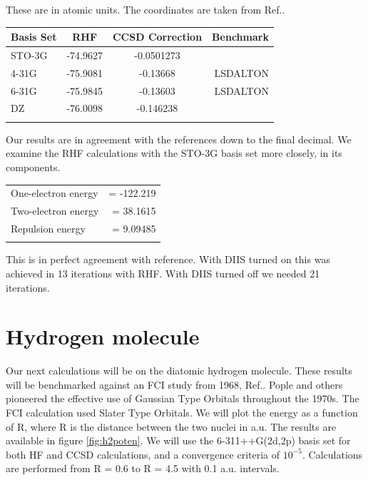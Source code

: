 \documentclass[a4paper,norsk,11pt,twoside]{report}
\begin{document}
These are in atomic units. The coordinates are taken from Ref.\cite{ccsd_benchmark_url_stuff}.

\begin{center}
\begin{tabular}{ l c c r }
	\hline
  	Basis Set & RHF & CCSD Correction & Benchmark \\ \hline
  	STO-3G & -74.9627 & -0.0501273 & \cite{ccsd_benchmark_url_stuff} \\ 
  	4-31G & -75.9081 & -0.13668 & LSDALTON \\ 
  	6-31G & -75.9845 & -0.13603 & LSDALTON \\ 
  	DZ & -76.0098 & -0.146238 & \cite{CCSDT-ref1} \\ \hline
  	\\
	\end{tabular}
\end{center}

Our results are in agreement with the references down to the final decimal. We examine the RHF calculations with the STO-3G basis set more closely, in its components.  \\

\begin{center}
\begin{tabular}{ l r }
  	One-electron energy & = -122.219 \\ 
  	Two-electron energy & = 38.1615 \\
  	Repulsion energy & = 9.09485 \\
  	\\
	\end{tabular}
\end{center}

This is in perfect agreement with reference. With DIIS turned on this was achieved in 13 iterations with RHF. With DIIS turned off we needed 21 iterations.

\section{Hydrogen molecule}
Our next calculations will be on the diatomic hydrogen molecule. These results will be benchmarked against an FCI study from 1968, Ref.\cite{fci_h2_molecule_stuff}. Pople and others pioneered the effective use of Gaussian Type Orbitals throughout the 1970s. The FCI calculation used Slater Type Orbitals. We will plot the energy as a function of R, where R is the distance between the two nuclei in a.u. The results are available in figure \ref{fig:h2poten}. We will use the 6-311++G(2d,2p) basis set for both HF and CCSD calculations, and a convergence criteria of $10^{-5}$. Calculations are performed from R = 0.6 to R = 4.5 with 0.1 a.u. intervals. \\
\end{document}
